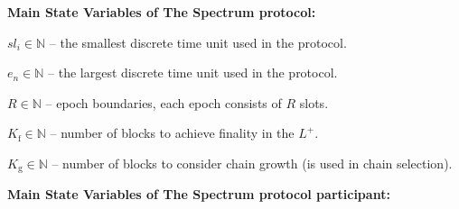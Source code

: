 \noindent
\textbf{Main State Variables of The Spectrum protocol:}
\begin{legal}
    \item[\ding{113}] $sl_i \in \mathbb{N}$ -- the smallest discrete time unit used in the protocol.
    \item[\ding{113}] $e_n \in \mathbb{N}$ -- the largest discrete time unit used in the protocol.
    \item[\ding{113}] $R \in \mathbb{N}$ -- epoch boundaries, each epoch consists of $R$ slots.
    \item[\ding{113}] $K_{\text{f}} \in \mathbb{N}$ -- number of blocks to achieve finality in the $L^+$.
    \item[\ding{113}] $K_{\text{g}} \in \mathbb{N}$ -- number of blocks to consider chain growth (is used in chain selection).

\end{legal}
\bigbreak
\noindent
\textbf{Main State Variables of The Spectrum protocol participant:}
